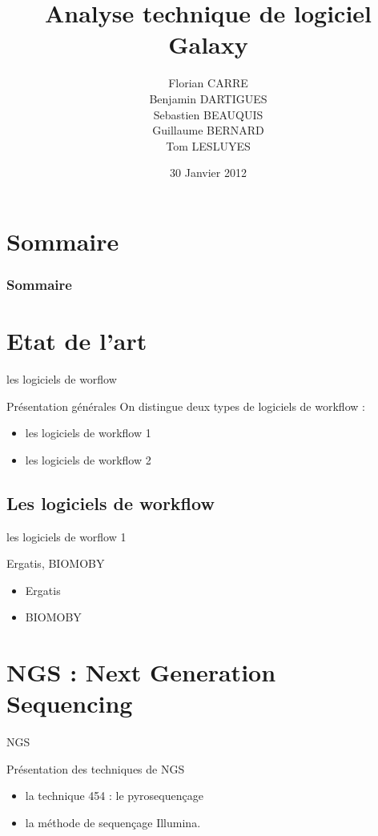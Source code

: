 \documentclass[12pt]{beamer}
\title[Galaxy]{Analyse technique de logiciel\\ Galaxy}
\author[F. C. | B. D. | S. B. | G. B. | T. L.]{Florian CARRE\\Benjamin DARTIGUES\\Sebastien BEAUQUIS\\Guillaume BERNARD\\Tom LESLUYES}
\date{30 Janvier 2012}
\institute[]{Université de Bordeaux 1}
\begin{document}
\maketitle

\section*{Sommaire}
\begin{frame}
\frametitle{Sommaire}
\tableofcontents[pausesections]
\end{frame}

\section{Etat de l'art}
\begin{frame}{les logiciels de worflow}
\begin{block}{Présentation générales}
On distingue deux types de logiciels de workflow : 
\begin{itemize}
 \item les logiciels de workflow 1
\item les logiciels de workflow 2
\end{itemize}
\end{block}
\end{frame}


\subsection{Les logiciels de workflow }
\begin{frame}{les logiciels de worflow 1}
\begin{block}{Ergatis, BIOMOBY}
\begin{itemize}
 \item Ergatis
\item BIOMOBY
\end{itemize}
\end{block}
\end{frame}



\section{NGS : Next Generation Sequencing}
\begin{frame}{NGS}
\begin{block}{Présentation des techniques de NGS}
\begin{itemize}
 \item la technique 454 : le pyrosequençage
\item la méthode de sequençage Illumina.
\end{itemize}
\end{block}
\end{frame}
\end{document}
